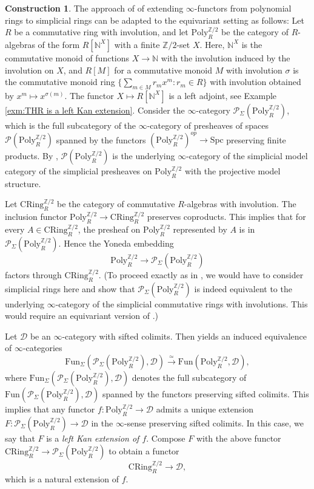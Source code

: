 \documentclass[10pt]{amsart}
\theoremstyle{definition}
\newtheorem{const}[thm]{Construction}
\numberwithin{equation}{section}
\newcommand{\N}{\mathbb{N}}
\newcommand{\Z}{\mathbb{Z}}
\newcommand{\cD}{\mathcal{D}}
\newcommand{\cP}{\mathcal{P}}
\newcommand{\CRing}{\mathrm{CRing}}
\newcommand{\Fun}{\mathrm{Fun}}
\newcommand{\Poly}{\mathrm{Poly}}
\newcommand{\Spc}{\mathrm{Spc}}
\begin{document}
\begin{const}\label{extendwithinvolutions}
The approach of \cite[Construction 2.1]{BMS19} of extending $\infty$-functors from polynomial rings to simplicial rings
can be adapted to the equivariant setting as follows:
Let $R$ be a commutative ring with involution,
and let $\Poly_R^{\Z/2}$ be the category of $R$-algebras of the form $R[\N^X]$ with a finite $\Z/2$-set $X$.
Here,
$\N^X$ is the commutative monoid of functions $X\to \N$ with the involution induced by the involution on $X$,
and $R[M]$ for a commutative monoid $M$ with involution $\sigma$ is the commutative monoid ring $\{\sum_{m\in M} r_m x^m : r_m \in R\}$ with involution obtained by $x^m\mapsto x^{\sigma(m)}$.
The functor $X\mapsto R[\N^X]$ is a left adjoint,
see Example \ref{exm:THR is a left Kan extension}.
Consider the $\infty$-category $\cP_{\Sigma}(\Poly_R^{\Z/2})$,
which is the full subcategory of the $\infty$-category of presheaves of spaces $\cP(\Poly_R^{\Z/2})$ spanned by the functors $(\Poly_R^{\Z/2})^{op}
\to \Spc$ preserving finite products.
By \cite[Corollary 5.5.9.3]{HTT},
$\cP(\Poly_R^{\Z/2})$ is the underlying $\infty$-category of the simplicial model category of the simplicial presheaves on $\Poly_R^{\Z/2}$ with the projective model structure.

Let $\CRing_{R}^{\Z/2}$ be the
category of commutative $R$-algebras with involution.
The inclusion functor $\Poly_R^{\Z/2}\to \CRing_R^{\Z/2}$ preserves coproducts.
This implies that for every $A\in \CRing_R^{\Z/2}$,
the presheaf on $\Poly_R^{\Z/2}$ represented by $A$ is in $\cP_{\Sigma}(\Poly_R^{\Z/2})$.
Hence the Yoneda embedding
\[
\Poly_R^{\Z/2}
\to
\cP_\Sigma(\Poly_R^{\Z/2})
\]
factors through $\CRing_R^{\Z/2}$.
(To proceed exactly as in \cite[Construction 2.1]{BMS19}, we would have to consider simplicial rings here and show that $\cP_\Sigma(\Poly_R^{\Z/2})$ is indeed equivalent to the underlying $\infty$-category of the simplicial commutative rings with involutions.
This would require an equivariant version of \cite[Example 5.1.3]{CS}.)

Let $\cD$ be an $\infty$-category with sifted colimits.
Then \cite[Proposition 5.5.8.15]{HTT} yields an induced equivalence of $\infty$-categories
\[
\Fun_\Sigma(\cP_{\Sigma}(\Poly_R^{\Z/2}),\cD)
\xrightarrow{\simeq}
\Fun(\Poly_R^{\Z/2},\cD),
\]
where $\Fun_\Sigma(\cP_{\Sigma}(\Poly_R^{\Z/2}),\cD)$ denotes the full subcategory of $\Fun(\cP_{\Sigma}(\Poly_R^{\Z/2}),\cD)$ spanned by the functors preserving sifted colimits.
This implies that any functor $f\colon \Poly_R^{\Z/2} \to \cD$ admits a unique extension $F\colon \cP_\Sigma(\Poly_R^{\Z/2})\to \cD$ in the $\infty$-sense 
 preserving sifted colimits.
In this case,
we say that $F$ is a \emph{left Kan extension of $f$}.
Compose $F$ with the above functor $\CRing_R^{\Z/2}\to \cP_\Sigma(\Poly_R^{\Z/2})$ to obtain a functor
\[
\CRing_R^{\Z/2}
\to
\cD,
\]
which is a natural extension of $f$.
\end{const}
\end{document}
